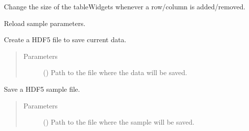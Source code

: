 \documentclass[a4paper,10pt,english]{sphinxmanual}
\begin{document}
\begin{fulllineitems}
\begin{fulllineitems}
\end{fulllineitems}


\begin{fulllineitems}
\label{\detokenize{autodoc/mrsprint/mrsprint:mrsprint.mainwindow.MainWindow.resizeTable2DEditor}}
Change the size of the tableWidgets whenever a row/column is added/removed.

\end{fulllineitems}


\begin{fulllineitems}
\label{\detokenize{autodoc/mrsprint/mrsprint:mrsprint.mainwindow.MainWindow.sampleSettingsChanges}}
Reload sample parameters.

\end{fulllineitems}


\begin{fulllineitems}
\label{\detokenize{autodoc/mrsprint/mrsprint:mrsprint.mainwindow.MainWindow.save}}
Create a HDF5 file to save current data.
\begin{quote}\begin{description}
\item[{Parameters}] \leavevmode
{} () \textendash{} Path to the file where the data will be saved.

\end{description}\end{quote}

\end{fulllineitems}


\begin{fulllineitems}
\label{\detokenize{autodoc/mrsprint/mrsprint:mrsprint.mainwindow.MainWindow.saveSample}}
Save a HDF5 sample file.
\begin{quote}\begin{description}
\item[{Parameters}] \leavevmode
{} () \textendash{} Path to the file where the sample will be saved.


\end{description}
\end{quote}
\end{fulllineitems}
\end{fulllineitems}
\end{document}
